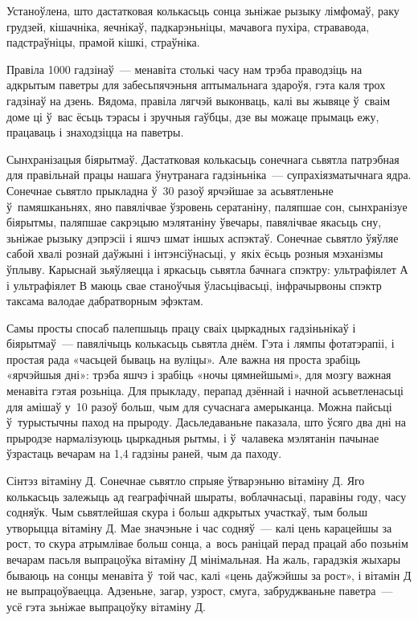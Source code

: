 Устаноўлена, што дастатковая колькасьць сонца зьніжае рызыку лімфомаў, раку грудзей, кішачніка, яечнікаў, падкарэньніцы, мачавога пухіра, стрававода, падстраўніцы, прамой кішкі, страўніка.

Правіла 1000 гадзінаў~--- менавіта столькі часу нам трэба праводзіць на адкрытым паветры для забесьпячэньня аптымальнага здароўя, гэта каля трох гадзінаў на дзень. Вядома, правіла лягчэй выконваць, калі вы жывяце ў~сваім доме ці ў~вас ёсьць тэрасы і зручныя гаўбцы, дзе вы можаце прымаць ежу, працаваць і знаходзіцца на паветры.

Сынхранізацыя біярытмаў. Дастатковая колькасьць сонечнага сьвятла патрэбная для правільнай працы нашага ўнутранага гадзіньніка~--- супрахіязматычнага ядра. Сонечнае сьвятло прыкладна ў~30 разоў ярчэйшае за асьвятленьне ў~памяшканьнях, яно павялічвае ўзровень сератаніну, паляпшае сон, сынхранізуе біярытмы, паляпшае сакрэцыю мэлятаніну ўвечары, павялічвае якасьць сну, зьніжае рызыку дэпрэсіі і яшчэ шмат іншых аспэктаў. Сонечнае сьвятло ўяўляе сабой хвалі рознай даўжыні і інтэнсіўнасьці, у~якіх ёсьць розныя мэханізмы ўплыву. Карыснай зьяўляецца і яркасьць сьвятла бачнага спэктру: ультрафіялет А і ультрафіялет В маюць свае станоўчыя ўласьцівасьці, інфрачырвоны спэктр таксама валодае дабратворным эфэктам.

Самы просты спосаб палепшыць працу сваіх цыркадных гадзіньнікаў і біярытмаў~--- павялічыць колькасьць сьвятла днём. Гэта і лямпы фотатэрапіі, і простая рада «часьцей бываць на вуліцы». Але важна ня проста зрабіць «ярчэйшыя дні»: трэба яшчэ і зрабіць «ночы цямнейшымі», для мозгу важная менавіта гэтая розьніца. Для прыкладу, перапад дзённай і начной асьветленасьці для амішаў у~10 разоў больш, чым для сучаснага амерыканца. Можна пайсьці ў~турыстычны паход на прыроду. Дасьледаваньне паказала, што ўсяго два дні на прыродзе нармалізуюць цыркадныя рытмы, і ў~чалавека мэлятанін пачынае ўзрастаць вечарам на 1,4 гадзіны раней, чым да паходу.

Сінтэз вітаміну Д. Сонечнае сьвятло спрыяе ўтварэньню вітаміну Д. Яго колькасьць залежыць ад геаграфічнай шыраты, воблачнасьці, паравіны году, часу содняўк. Чым сьвятлейшая скура і больш адкрытых участкаў, тым больш утворыцца вітаміну Д. Мае значэньне і час содняў~--- калі цень карацейшы за рост, то скура атрымлівае больш сонца, а~вось раніцай перад працай або позьнім вечарам пасьля выпрацоўка вітаміну Д мінімальная. На жаль, гарадзкія жыхары бываюць на сонцы менавіта ў~той час, калі «цень даўжэйшы за рост», і вітамін Д не выпрацоўваецца. Адзеньне, загар, узрост, смуга, забруджваньне паветра~--- усё гэта зьніжае выпрацоўку вітаміну Д.

